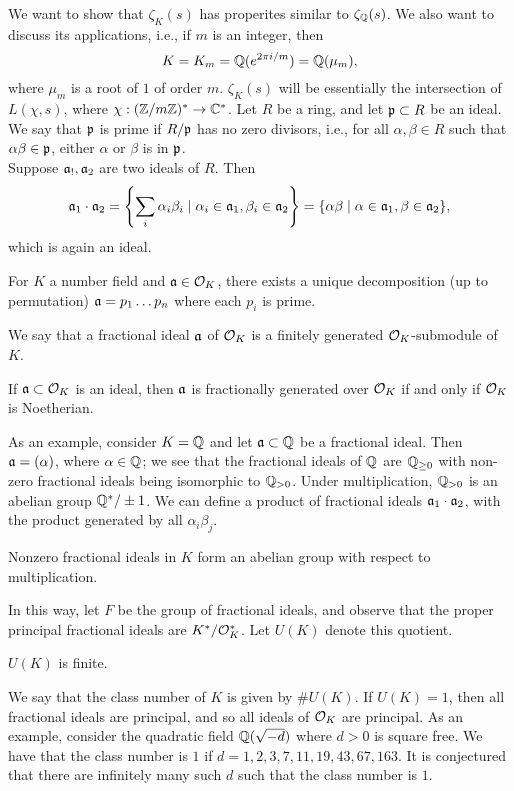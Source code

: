 \noindent We want to show that $\zeta_K(s)$ has properites similar to $\zeta_\mathbb Q(s)$. We also want to discuss its applications, i.e., if $m$ is an integer, then
\[ K = K_m = \mathbb Q(e^{2\pi i/m}) = \mathbb Q(\mu_m), \]
where $\mu_m$ is a root of $1$ of order $m$. $\zeta_K(s)$ will be essentially the intersection of $L(\chi, s)$, where $\chi : (\mathbb Z/m\mathbb Z)^\ast \to \mathbb C^\ast$. Let $R$ be a ring, and let $\mathfrak p \subset R$ be an ideal. We say that $\mathfrak p$ is prime if $R/\mathfrak p$ has no zero divisors, i.e., for all $\alpha, \beta \in R$ such that $\alpha \beta \in \mathfrak p$, either $\alpha$ or $\beta$ is in $\mathfrak p$.
\\[8pt]
Suppose $\mathfrak a_!, \mathfrak a_2$ are two ideals of $R$. Then
\[ \mathfrak a_1 \cdot \mathfrak a_2 = \left\{\sum_i \alpha_i \beta_i \mid \alpha_i \in \mathfrak a_1, \beta_i \in \mathfrak a_2\right\} = \{\alpha \beta \mid \alpha \in \mathfrak a_1, \beta \in \mathfrak a_2\}, \]
which is again an ideal.
\begin{theorem}
    For $K$ a number field and $\mathfrak a \in \mathcal O_K$, there exists a unique decomposition (up to permutation) $\mathfrak a = p_1 \dots p_n$ where each $p_i$ is prime.
\end{theorem}
\noindent We say that a fractional ideal $\mathfrak a$ of $\mathcal O_K$ is a finitely generated $\mathcal O_K$-submodule of $K$.
\begin{lemma}
    If $\mathfrak a \subset \mathcal O_K$ is an ideal, then $\mathfrak a$ is fractionally generated over $\mathcal O_K$ if and only if $\mathcal O_K$ is Noetherian.
\end{lemma}
\noindent As an example, consider $K = \mathbb Q$ and let $\mathfrak a \subset \mathbb Q$ be a fractional ideal. Then $\mathfrak a = (\alpha)$, where $\alpha \in \mathbb Q$; we see that the fractional ideals of $\mathbb Q$ are $\mathbb Q_{\geq 0}$ with non-zero fractional ideals being isomorphic to $\mathbb Q_{>0}$. Under multiplication, $\mathbb Q_{>0}$ is an abelian group $\mathbb Q^\ast / \pm 1$. We can define a product of fractional ideals $\mathfrak a_1 \cdot \mathfrak a_2$, with the product generated by all $\alpha_i \beta_j$.
\begin{theorem}
    Nonzero fractional ideals in $K$ form an abelian group with respect to multiplication.
\end{theorem}
\noindent In this way, let $F$ be the group of fractional ideals, and observe that the proper principal fractional ideals are $K^\ast / \mathcal O_K^\ast$. Let $U(K)$ denote this quotient.
\begin{theorem}
    $U(K)$ is finite.
\end{theorem}
\noindent We say that the class number of $K$ is given by $\# U(K)$. If $U(K)  = 1$, then all fractional ideals are principal, and so all ideals of $\mathcal O_K$ are principal. As an example, consider the quadratic field $\mathbb Q(\sqrt{-d})$ where $d > 0$ is square free. We have that the class number is $1$ if $d = 1, 2, 3, 7, 11, 19, 43, 67, 163$. It is conjectured that there are infinitely many such $d$ such that the class number is $1$.